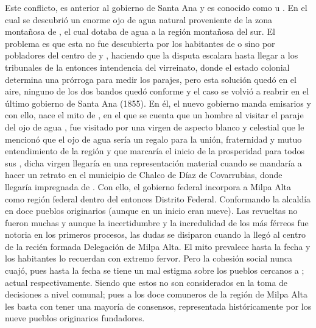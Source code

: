 Este conflicto, es anterior al gobierno de Santa Ana y es conocido como  u .
En el cual se descubrió un enorme ojo de agua natural proveniente de la zona
montañosa de , el cual dotaba de agua a la región
montañosa del sur. El problema es que esta no fue descubierta por los habitantes de  o
 sino por pobladores del centro de  y , haciendo que la
disputa escalara hasta llegar a los tribunales de la entonces intendencia del virreinato, donde el estado colonial determina
una prórroga para medir los parajes, pero esta solución quedó en el aire, ninguno de los dos bandos quedó conforme y el caso se
volvió a reabrir en el último gobierno de Santa Ana (1855). En él, el nuevo gobierno manda emisarios y con ello, nace el mito
de , en el que se cuenta que un hombre al visitar el paraje del ojo de agua ,
fue visitado por una virgen de aspecto blanco y celestial que le mencionó que el ojo de agua sería un regalo para la unión,
fraternidad y mutuo entendimiento de la región y que marcaría el inicio de la prosperidad para todos sus
, dicha virgen llegaría en una representación material cuando se mandaría a hacer un
retrato en el municipio de Chalco de Díaz de Covarrubias, donde llegaría impregnada de . Con ello,
el gobierno federal incorpora a Milpa Alta como región federal dentro del entonces Distrito Federal. Conformando la alcaldía en
doce pueblos originarios (aunque en un inicio eran nueve). Las revueltas no fueron muchas y aunque la incertidumbre y la
incredulidad de los más férreos fue notoria en los primeros procesos, las dudas se disiparon cuando la 
llegó al centro de la recién formada Delegación de Milpa Alta. El mito prevalece hasta la fecha y los habitantes lo recuerdan
con extremo fervor. Pero la cohesión social nunca cuajó, pues hasta la fecha se tiene un mal estigma sobre los pueblos cercanos
a ; actual 
respectivamente. Siendo que estos no son considerados en la toma de decisiones a nivel comunal; pues a los doce comuneros de la región
de Milpa Alta les basta con tener una mayoría de consensos, representada históricamente por los nueve pueblos originarios fundadores.

